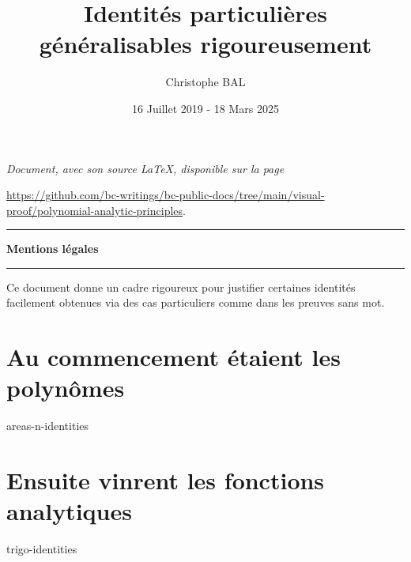 \documentclass[12pt]{amsart}
\begin{document}
\title{Identités particulières généralisables rigoureusement}
\author{Christophe BAL}
\date{16 Juillet 2019 - 18 Mars 2025}

\maketitle

\begin{center}
	\itshape
	Document, avec son source \LaTeX, disponible sur la page

	\url{https://github.com/bc-writings/bc-public-docs/tree/main/visual-proof/polynomial-analytic-principles}.
\end{center}


\bigskip


\begin{center}
	\hrule\vspace{.3em}
	{
		\fontsize{1.35em}{1em}\selectfont
		\textbf{Mentions \og légales \fg}
	}

	\vspace{0.45em}
	\doclicenseThis
	\hrule
\end{center}


\bigskip


\setcounter{tocdepth}{1}
\tableofcontents



\newpage

\begin{meta-abstract*}
	Ce document donne un cadre rigoureux pour justifier certaines identités facilement obtenues via des cas particuliers  comme dans les preuves sans mot. 
\end{meta-abstract*}


\section{Au commencement étaient les polynômes}

{areas-n-identities}



\newpage

\section{Ensuite vinrent les fonctions analytiques}

{trigo-identities}
\end{document}
